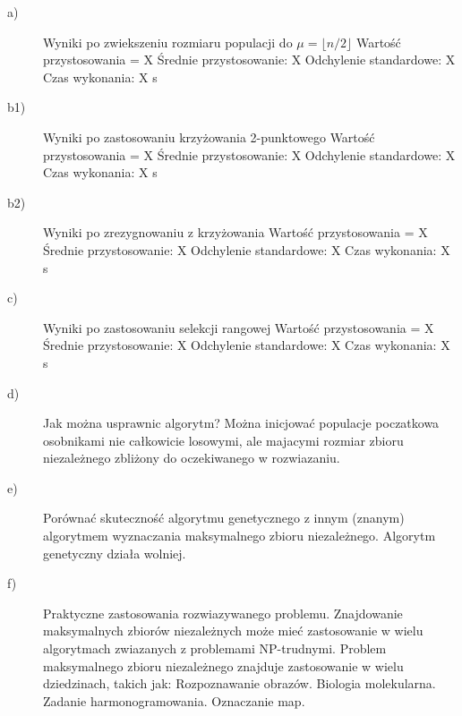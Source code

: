 \documentclass[11pt]{article}
\begin{document}
\begin{description}

\item[a)] Wyniki po zwiekszeniu rozmiaru populacji do $ \mu = \lfloor n/2 \rfloor $\newline
Wartość przystosowania = X\newline
Średnie przystosowanie: X\newline
Odchylenie standardowe: X\newline
Czas wykonania: X s
\item[b1)] Wyniki po zastosowaniu krzyżowania 2-punktowego\newline
Wartość przystosowania = X\newline
Średnie przystosowanie: X\newline
Odchylenie standardowe: X\newline
Czas wykonania: X s
\item[b2)] Wyniki po zrezygnowaniu z krzyżowania\newline
Wartość przystosowania = X\newline
Średnie przystosowanie: X\newline
Odchylenie standardowe: X\newline
Czas wykonania: X s
\item[c)] Wyniki po zastosowaniu selekcji rangowej\newline
Wartość przystosowania = X\newline
Średnie przystosowanie: X\newline
Odchylenie standardowe: X\newline
Czas wykonania: X s
\item[d)] Jak można usprawnic algorytm?\newline
Można inicjować populacje poczatkowa osobnikami nie całkowicie losowymi, ale
majacymi rozmiar zbioru niezależnego zbliżony do oczekiwanego w rozwiazaniu.
\item[e)] Porównać skuteczność algorytmu genetycznego z innym (znanym)
algorytmem wyznaczania maksymalnego zbioru niezależnego.\newline
Algorytm genetyczny działa wolniej.
\item[f)] Praktyczne zastosowania rozwiazywanego problemu.\newline
Znajdowanie maksymalnych zbiorów niezależnych może mieć zastosowanie w wielu
algorytmach zwiazanych z problemami NP-trudnymi.\newline
Problem maksymalnego zbioru niezależnego znajduje zastosowanie w wielu dziedzinach, takich jak:\newline
Rozpoznawanie obrazów.\newline
Biologia molekularna.\newline
Zadanie harmonogramowania.\newline
Oznaczanie map.
\end{description}
\end{document}
